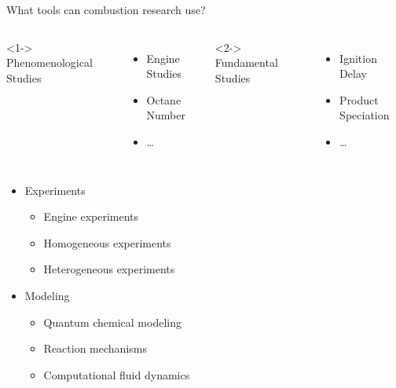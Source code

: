 \documentclass{beamer}
\begin{document}
\begin{frame}{What tools can combustion research use?}
    \vspace{0.5cm}
    \begin{columns}
        <1->
            Phenomenological Studies
            \begin{itemize}
                \item Engine Studies
                \item Octane Number
                \item \ldots
            \end{itemize}
        <2->
            Fundamental Studies
            \begin{itemize}
                \item Ignition Delay
                \item Product Speciation
                \item \ldots
            \end{itemize}
    \end{columns}
    \vspace{0.5cm}
    \hspace{6.25cm} 
    \begin{itemize}
        \item<3-> Experiments 
        \begin{itemize}[<4->]
            \item Engine experiments
            \item Homogeneous experiments
            \item Heterogeneous experiments
        \end{itemize}
        \item<3->Modeling
        \begin{itemize}[<5->]
            \item Quantum chemical modeling
            \item Reaction mechanisms
            \item Computational fluid dynamics
        \end{itemize}
    \end{itemize}
\end{frame}
\end{document}
